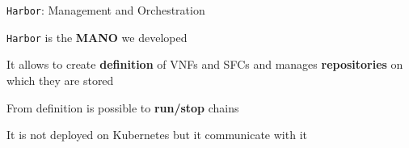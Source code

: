 \begin{frame}{\texttt{Harbor}: Management and Orchestration}

  \texttt{Harbor} is the \textbf{MANO} we developed

  \vfill{}

  It allows to create \textbf{definition} of VNFs and SFCs and manages
  \textbf{repositories} on which they are stored

  \vfill{}

  From definition is possible to \textbf{run/stop} chains

  \vfill{}

  It is not deployed on Kubernetes but it communicate with it

  \vfill{}

\end{frame}